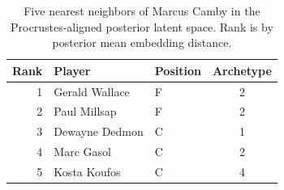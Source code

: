 \begin{table}[htbp]
  \centering\small
  \begin{tabular}{rllc}
    \toprule
    Rank & Player & Position & Archetype \\
    \midrule
    1 & Gerald Wallace & F & 2 \\
    2 & Paul Millsap & F & 2 \\
    3 & Dewayne Dedmon & C & 1 \\
    4 & Marc Gasol & C & 2 \\
    5 & Kosta Koufos & C & 4 \\
    \bottomrule
  \end{tabular}
  \caption{Five nearest neighbors of Marcus Camby in the Procrustes-aligned posterior latent space. Rank is by posterior mean embedding distance.}
  \label{tab:Marcus_Camby_neighbors}
\end{table}

